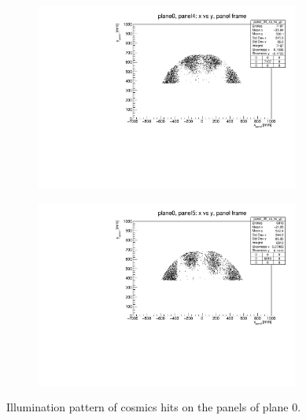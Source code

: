 \begin{figure}[!h]
\begin{subfigure}[b]{0.4\textwidth}
        \includegraphics[width=0.95\textwidth]{figures/pdf/plane0_panel4_x_vs_y_all.pdf}
        \label{fig:panel4plane0}
    \end{subfigure}
    \hfill
    \begin{subfigure}[b]{0.4\textwidth}
        \centering
        \includegraphics[width=0.95\textwidth]{figures/pdf/plane0_panel5_x_vs_y_all.pdf}
        \label{fig:panel5plane0}
    \end{subfigure}
       \caption[Plane 0 illumination pattern of cosmic hits.]{Illumination pattern of cosmics hits on the panels of plane 0.}
       \label{fig:plane0}
\end{figure}
